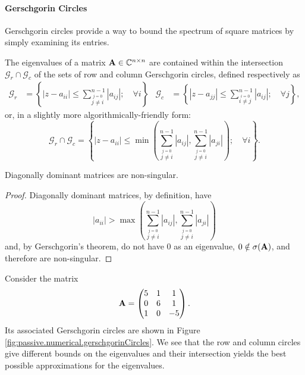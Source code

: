 \paragraph{Gerschgorin Circles}
Gerschgorin circles provide a way to bound the spectrum 
of square matrices by simply examining its entries.

\begin{thm}
 The eigenvalues of a matrix $\mathbf{A}\in\mathbb{C}^{n\times n}$ are
 contained within the intersection $\mathcal{G}_r\cap\mathcal{G}_c$
 of the sets of row and column Gerschgorin circles, defined respectively as
  \begin{align*}
   \mathcal{G}_r	&= \left\{|z-a_{ii}| \leq \sum_{\stackrel{j=0}{j\neq i}}^{n-1} |a_{ij}|; \quad \forall i\right\}
  & \mathcal{G}_c	&= \left\{|z-a_{jj}| \leq \sum_{\stackrel{i=0}{i\neq j}}^{n-1} |a_{ij}|; \quad \forall j\right\},
  \end{align*}
 or, in a slightly more algorithmically-friendly form:
  \begin{equation}
   \mathcal{G}_r\cap\mathcal{G}_c = \left\{|z-a_{ii}| \leq \min\left(\sum_{\stackrel{j=0}{j\neq i}}^{n-1} |a_{ij}|,\sum_{\stackrel{j=0}{j\neq i}}^{n-1} |a_{ji}|\right)
				     ;\quad \forall i\right\}.
  \end{equation}
\end{thm}

\begin{corr}\label{corr:passive.numerical.diagDominantMatrices}
 Diagonally dominant matrices are non-singular.
\end{corr}

 \begin{proof}
  Diagonally dominant matrices, by definition, have 
    \begin{equation}
     |a_{ii}| > \max\left(\sum_{\stackrel{j=0}{j\neq i}}^{n-1} |a_{ij}|, \sum_{\stackrel{j=0}{j\neq i}}^{n-1} |a_{ji}|\right)
    \end{equation}
  and, by Gerschgorin's theorem, do not have 0 as an eigenvalue, $0\notin\sigma(\mathbf{A})$, and therefore are 
  non-singular.
 \end{proof}

\begin{exmp}
  Consider the matrix \cite[p.~499]{MEY2001}
  \begin{equation}
    \label{eq:passive.numerical.exampleMatrixGerschgorin}
    \mathbf{A} = \begin{pmatrix} 5 & 1 & 1 \\ 0 & 6 & 1 \\ 1 & 0 & -5 \end{pmatrix}.
  \end{equation}
  Its associated Gerschgorin circles are shown in Figure \ref{fig:passive.numerical.gerschgorinCircles}. 
  We see that the row and column circles give different bounds on the eigenvalues and their intersection 
  yields the best possible approximations for the eigenvalues. 
\end{exmp}

